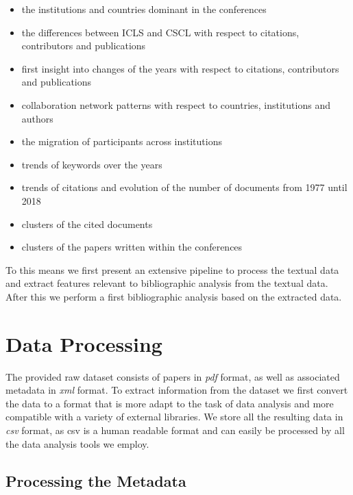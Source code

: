 \documentclass[journal,twocolumn]{IEEEtran}
\providecommand{\tightlist}{%
      \setlength{\itemsep}{0pt}\setlength{\parskip}{0pt}}
\begin{document}
\begin{itemize}
\tightlist
\item
  the institutions and countries dominant in the conferences
\item
  the differences between ICLS and CSCL with respect to citations,
  contributors and publications
\item
  first insight into changes of the years with respect to citations,
  contributors and publications
\item
  collaboration network patterns with respect to countries, institutions
  and authors
\item
  the migration of participants across institutions
\item
  trends of keywords over the years
\item
  trends of citations and evolution of the number of documents from 1977
  until 2018
\item
  clusters of the cited documents
\item
  clusters of the papers written within the conferences
\end{itemize}

To this means we first present an extensive pipeline to process the
textual data and extract features relevant to bibliographic analysis
from the textual data. After this we perform a first bibliographic
analysis based on the extracted data.

    \section{Data Processing}\label{data-processing}

    The provided raw dataset consists of papers in \emph{pdf} format, as
well as associated metadata in \emph{xml} format. To extract information
from the dataset we first convert the data to a format that is more
adapt to the task of data analysis and more compatible with a variety of
external libraries. We store all the resulting data in \emph{csv}
format, as csv is a human readable format and can easily be processed by
all the data analysis tools we employ.

    \subsection{Processing the Metadata}\label{processing-the-metadata}
\end{document}

